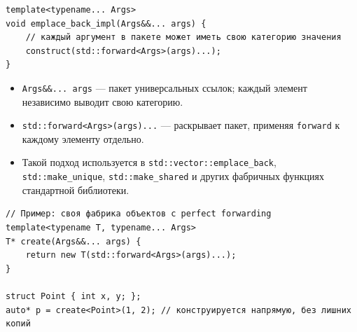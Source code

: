 \documentclass[a4paper,12pt]{article}
\begin{document}
\begin{lstlisting}
template<typename... Args>
void emplace_back_impl(Args&&... args) {
    // каждый аргумент в пакете может иметь свою категорию значения
    construct(std::forward<Args>(args)...);
}
\end{lstlisting}

\begin{itemize}
  \item \texttt{Args\&\&... args} --- пакет универсальных ссылок; каждый элемент
        независимо выводит свою категорию.
  \item \texttt{std::forward<Args>(args)...} --- раскрывает пакет, применяя
        \texttt{forward} к каждому элементу отдельно.
  \item Такой подход используется в \texttt{std::vector::emplace\_back},
        \texttt{std::make\_unique}, \texttt{std::make\_shared} и других фабричных
        функциях стандартной библиотеки.
\end{itemize}

\begin{lstlisting}
// Пример: своя фабрика объектов с perfect forwarding
template<typename T, typename... Args>
T* create(Args&&... args) {
    return new T(std::forward<Args>(args)...);
}

struct Point { int x, y; };
auto* p = create<Point>(1, 2); // конструируется напрямую, без лишних копий
\end{lstlisting}


\end{document}
